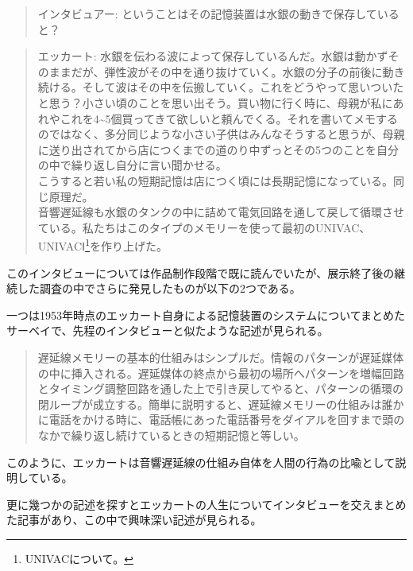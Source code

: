 \begin{quote}
インタビュアー: ということはその記憶装置は水銀の動きで保存していると？
\end{quote}

\begin{quote}
エッカート:
水銀を伝わる波によって保存しているんだ。水銀は動かずそのままだが、弾性波がその中を通り抜けていく。水銀の分子の前後に動き続ける。そして波はその中を伝搬していく。これをどうやって思いついたと思う？小さい頃のことを思い出そう。買い物に行く時に、母親が私にあれやこれを4\textasciitilde{}5個買ってきて欲しいと頼んでくる。それを書いてメモするのではなく、多分同じような小さい子供はみんなそうすると思うが、母親に送り出されてから店につくまでの道のり中ずっとその5つのことを自分の中で繰り返し自分に言い聞かせる。\\
こうすると若い私の短期記憶は店につく頃には長期記憶になっている。同じ原理だ。\\
音響遅延線も水銀のタンクの中に詰めて電気回路を通して戻して循環させている。私たちはこのタイプのメモリーを使って最初のUNIVAC、UNIVACⅠ\footnote{UNIVACについて。}を作り上げた。
\end{quote}

\autocite{eckertinterview}

このインタビューについては作品制作段階で既に読んでいたが、展示終了後の継続した調査の中でさらに発見したものが以下の2つである。

一つは1953年時点のエッカート自身による記憶装置のシステムについてまとめたサーベイ\autocite{eckert1953survey}で、先程のインタビューと似たような記述が見られる。

\begin{quote}
遅延線メモリーの基本的仕組みはシンプルだ。情報のパターンが遅延媒体の中に挿入される。遅延媒体の終点から最初の場所へパターンを増幅回路とタイミング調整回路を通した上で引き戻してやると、パターンの循環の閉ループが成立する。簡単に説明すると、遅延線メモリーの仕組みは誰かに電話をかける時に、電話帳にあった電話番号をダイアルを回すまで頭のなかで繰り返し続けているときの短期記憶と等しい。
\end{quote}

このように、エッカートは音響遅延線の仕組み自体を人間の行為の比喩として説明している。

更に幾つかの記述を探すとエッカートの人生についてインタビューを交えまとめた記事\autocite{eckstein1996j}があり、この中で興味深い記述が見られる。

